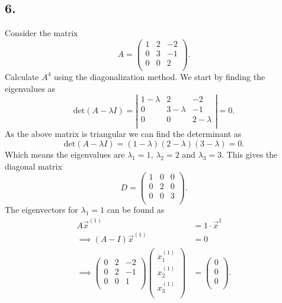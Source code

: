 \subsection*{6.} Consider the matrix
\[ 
A = \begin{pmatrix}
1 & 2 & -2\\
0 & 3 & -1\\
0 & 0 & 2\\
\end{pmatrix}
.\]
Calculate $A^{4}$ using the diagonalization method.
\bigbreak
We start by finding the eigenvalues as
\[ 
\mathrm{det}(A - \lambda I) = \left| \begin{array}{ccc}
1 - \lambda & 2 & -2\\
0 & 3-\lambda & -1\\
0 & 0 & 2 -\lambda\\
\end{array} \right| = 0
.\]
As the above matrix is triangular we can find the determinant as
\[ 
\mathrm{det}(A - \lambda I) = (1-\lambda)(2-\lambda)(3-\lambda) = 0
.\]
Which means the eigenvalues are $\lambda_1 = 1$, $\lambda_2 = 2$ and $\lambda_3 = 3$. This gives the diagonal matrix
\[ 
D = \begin{pmatrix}
1 & 0 & 0\\
0 & 2 & 0\\
0 & 0 & 3\\
\end{pmatrix}
.\]
The eigenvectors for $\lambda_1 = 1$ can be found as
\begin{align*}
  A \Vec{x}^{(1)} &= 1\cdot \Vec{x}^{1} \\
  \implies (A-I) \Vec{x}^{(1)} &= 0 \\
  \implies \begin{pmatrix}
  0 & 2 & -2\\
  0 & 2 & -1\\
  0 & 0 & 1\\
  \end{pmatrix} \begin{pmatrix}
  x_1^{(1)}\\
  x_2^{(1)}\\
  x_3^{(1)}\\
  \end{pmatrix} &= \begin{pmatrix}
  0\\
  0\\
  0\\
  \end{pmatrix}
.\end{align*}

